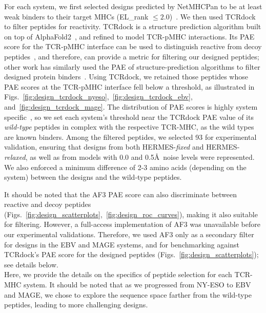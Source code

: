  For each system, we first selected designs predicted by NetMHCPan to be at least weak
binders to their target MHCs (EL\_rank $\leq 2.0$)~\cite{reynisson_netmhcpan-41_2020}. We then used
TCRdock~\cite{Bradley2023-rl} to filter peptides for reactivity. TCRdock is a structure prediction
algorithm built on top of AlphaFold2~\cite{Jumper2021-hl}, and refined to model TCR-pMHC
interactions. Its PAE score for the TCR-pMHC interface can be used to distinguish reactive from
decoy peptides~\cite{Bradley2023-rl}, and therefore, can provide a metric for filtering our designed
peptides; other work has similarly used the PAE of structure-prediction algorithms to filter
designed protein binders~\cite{Liu2024-vi}. Using TCRdock, we retained those peptides whose PAE
scores at the TCR-pMHC interface fell below a threshold, as illustrated in
Figs.~\ref{fig:design_tcrdock_nyeso},~\ref{fig:design_tcrdock_ebv},
and~\ref{fig:design_tcrdock_mage}. The distribution of PAE scores is highly system
specific~\cite{Liu2024-vi}, so we set each system's threshold near the TCRdock PAE value of its {\em
wild-type} peptides in complex with the respective TCR-MHC, as the wild types are known binders.
Among the filtered peptides, we selected 93 for experimental validation, ensuring that designs from
both HERMES-{\em fixed} and HERMES-{\em relaxed}, as well as from models with 0.0 and 0.5\AA\, noise
levels were represented. We also enforced a minimum difference of 2-3 amino acids (depending on the
system) between the designs and the wild-type peptides.

It should be noted that the AF3 PAE score can also discriminate between reactive and decoy peptides
(Figs.~\ref{fig:design_scatterplots},~\ref{fig:design_roc_curves}), making it also suitable for
filtering. However, a full-access implementation of AF3 was unavailable before our experimental
validations. Therefore, we used AF3 only as a secondary filter for designs in the EBV and MAGE
systems, and for benchmarking against TCRdock's PAE score for the designed peptides
(Figs.~\ref{fig:design_scatterplots}); see details below.\\


 Here, we provide the details on the
specifics of peptide selection for each TCR-MHC system. It should be noted that as we progressed
from NY-ESO to EBV and MAGE, we chose to explore the sequence space farther from the wild-type
peptides, leading to more challenging designs.


